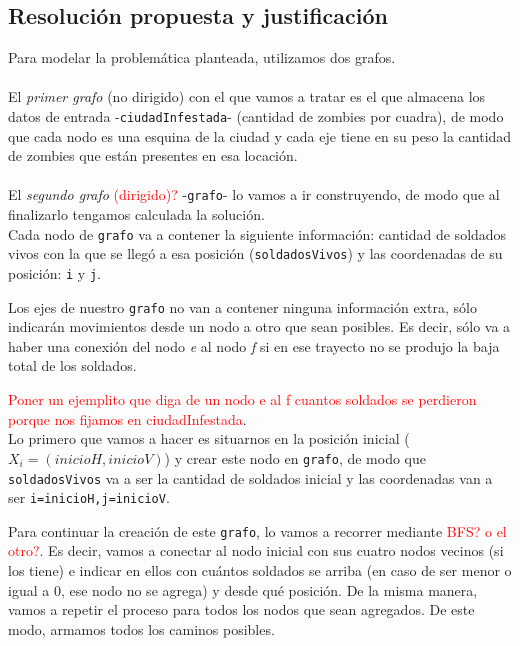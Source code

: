 \newpage
\subsection{Resoluci\'on propuesta y justificaci\'on}

Para modelar la problem\'atica planteada, utilizamos dos grafos.\\
\\

El \emph{primer grafo} (no dirigido) con el que vamos a tratar es el que almacena los datos de entrada -\texttt{ciudadInfestada}- (cantidad de zombies por cuadra), de modo que cada nodo es una esquina de la ciudad y cada eje tiene en su peso la cantidad de zombies que est\'an presentes en esa locaci\'on.\\
\\

El \emph{segundo grafo} \textcolor{red}{(dirigido)?} -\texttt{grafo}- lo vamos a ir construyendo, de modo que al finalizarlo tengamos calculada la soluci\'on.\\

Cada nodo de \texttt{grafo} va a contener la siguiente informaci\'on: cantidad de soldados vivos con la que se lleg\'o a esa posici\'on (\texttt{soldadosVivos}) y las coordenadas de su posici\'on: \texttt{i} y \texttt{j}.

Los ejes de nuestro \texttt{grafo} no van a contener ninguna informaci\'on extra, s\'olo indicar\'an movimientos desde un nodo a otro que sean posibles. Es decir, s\'olo va a haber una conexi\'on del nodo \emph{e} al nodo \emph{f} si en ese trayecto no se produjo la baja total de los soldados.

\textcolor{red}{Poner un ejemplito que diga de un nodo e al f cuantos soldados se perdieron porque nos fijamos en ciudadInfestada}.\\



Lo primero que vamos a hacer es situarnos en la posici\'on inicial ($X_i = (inicioH, inicioV)$) y crear este nodo en \texttt{grafo}, de modo que \texttt{soldadosVivos} va a ser la cantidad de soldados inicial y las coordenadas van a ser \texttt{i=inicioH,j=inicioV}. 

Para continuar la creaci\'on de este \texttt{grafo}, lo vamos a recorrer mediante \textcolor{red}{BFS? o el otro?}. Es decir, vamos a conectar al nodo inicial con sus cuatro nodos vecinos (si los tiene) e indicar en ellos con cu\'antos soldados se arriba (en caso de ser menor o igual a 0, ese nodo no se agrega) y desde qu\'e posici\'on. De la misma manera, vamos a repetir el proceso para todos los nodos que sean agregados. De este modo, armamos todos los caminos posibles.

